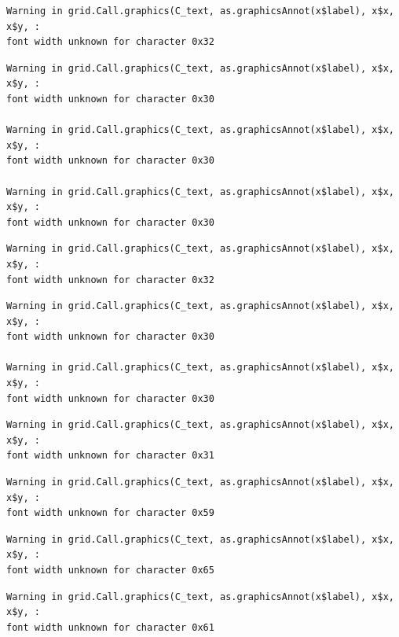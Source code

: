 \documentclass[
  letterpaper,
  DIV=11,
  numbers=noendperiod]{scrreprt}
\begin{document}
\begin{verbatim}
Warning in grid.Call.graphics(C_text, as.graphicsAnnot(x$label), x$x, x$y, :
font width unknown for character 0x32
\end{verbatim}

\begin{verbatim}
Warning in grid.Call.graphics(C_text, as.graphicsAnnot(x$label), x$x, x$y, :
font width unknown for character 0x30

Warning in grid.Call.graphics(C_text, as.graphicsAnnot(x$label), x$x, x$y, :
font width unknown for character 0x30

Warning in grid.Call.graphics(C_text, as.graphicsAnnot(x$label), x$x, x$y, :
font width unknown for character 0x30
\end{verbatim}

\begin{verbatim}
Warning in grid.Call.graphics(C_text, as.graphicsAnnot(x$label), x$x, x$y, :
font width unknown for character 0x32
\end{verbatim}

\begin{verbatim}
Warning in grid.Call.graphics(C_text, as.graphicsAnnot(x$label), x$x, x$y, :
font width unknown for character 0x30

Warning in grid.Call.graphics(C_text, as.graphicsAnnot(x$label), x$x, x$y, :
font width unknown for character 0x30
\end{verbatim}

\begin{verbatim}
Warning in grid.Call.graphics(C_text, as.graphicsAnnot(x$label), x$x, x$y, :
font width unknown for character 0x31
\end{verbatim}

\begin{verbatim}
Warning in grid.Call.graphics(C_text, as.graphicsAnnot(x$label), x$x, x$y, :
font width unknown for character 0x59
\end{verbatim}

\begin{verbatim}
Warning in grid.Call.graphics(C_text, as.graphicsAnnot(x$label), x$x, x$y, :
font width unknown for character 0x65
\end{verbatim}

\begin{verbatim}
Warning in grid.Call.graphics(C_text, as.graphicsAnnot(x$label), x$x, x$y, :
font width unknown for character 0x61
\end{verbatim}
\end{document}
